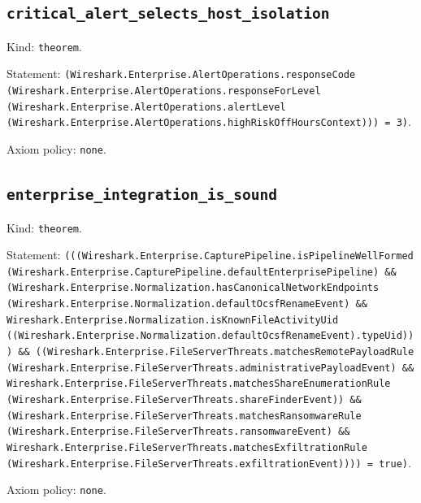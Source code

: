 \documentclass[11pt]{article}
\begin{document}
\subsection*{\texttt{critical\_alert\_selects\_host\_isolation}}
\noindent Kind: \texttt{theorem}.\par
\noindent Statement: \texttt{(Wireshark.Enterprise.AlertOperations.responseCode (Wireshark.Enterprise.AlertOperations.responseForLevel (Wireshark.Enterprise.AlertOperations.alertLevel (Wireshark.Enterprise.AlertOperations.highRiskOffHoursContext))) = 3)}.\par
\noindent Axiom policy: \texttt{none}.\par
\subsection*{\texttt{enterprise\_integration\_is\_sound}}
\noindent Kind: \texttt{theorem}.\par
\noindent Statement: \texttt{(((Wireshark.Enterprise.CapturePipeline.isPipelineWellFormed (Wireshark.Enterprise.CapturePipeline.defaultEnterprisePipeline) \&\& (Wireshark.Enterprise.Normalization.hasCanonicalNetworkEndpoints (Wireshark.Enterprise.Normalization.defaultOcsfRenameEvent) \&\& Wireshark.Enterprise.Normalization.isKnownFileActivityUid ((Wireshark.Enterprise.Normalization.defaultOcsfRenameEvent).typeUid))) \&\& ((Wireshark.Enterprise.FileServerThreats.matchesRemotePayloadRule (Wireshark.Enterprise.FileServerThreats.administrativePayloadEvent) \&\& Wireshark.Enterprise.FileServerThreats.matchesShareEnumerationRule (Wireshark.Enterprise.FileServerThreats.shareFinderEvent)) \&\& (Wireshark.Enterprise.FileServerThreats.matchesRansomwareRule (Wireshark.Enterprise.FileServerThreats.ransomwareEvent) \&\& Wireshark.Enterprise.FileServerThreats.matchesExfiltrationRule (Wireshark.Enterprise.FileServerThreats.exfiltrationEvent)))) = true)}.\par
\noindent Axiom policy: \texttt{none}.\par
\end{document}
